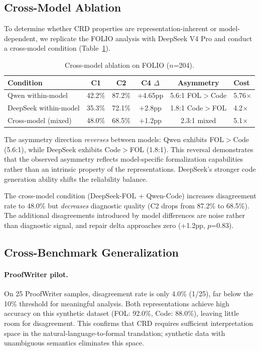 \documentclass[11pt]{article}
\begin{document}
\subsection{Cross-Model Ablation}
\label{sec:crossmodel}

To determine whether CRD properties are representation-inherent or model-dependent, we replicate the FOLIO analysis with DeepSeek V4 Pro and conduct a cross-model condition (Table~\ref{tab:crossmodel}).

\begin{table}[t]
\centering
\caption{Cross-model ablation on FOLIO ($n$=204).}
\label{tab:crossmodel}
\begin{tabular}{lccccl}
\toprule
Condition & C1 & C2 & C4 $\Delta$ & Asymmetry & Cost \\
\midrule
Qwen within-model      & 42.2\% & 87.2\% & $+$4.65pp & 5.6:1 FOL$>$Code  & 5.76$\times$ \\
DeepSeek within-model  & 35.3\% & 72.1\% & $+$2.8pp  & 1.8:1 Code$>$FOL  & 4.2$\times$ \\
Cross-model (mixed)    & 48.0\% & 68.5\% & $+$1.2pp  & 2.3:1 mixed       & 5.1$\times$ \\
\bottomrule
\end{tabular}
\end{table}

The asymmetry direction \emph{reverses} between models: Qwen exhibits FOL$>$Code (5.6:1), while DeepSeek exhibits Code$>$FOL (1.8:1). This reversal demonstrates that the observed asymmetry reflects model-specific formalization capabilities rather than an intrinsic property of the representations. DeepSeek's stronger code generation ability shifts the reliability balance.

The cross-model condition (DeepSeek-FOL + Qwen-Code) increases disagreement rate to 48.0\% but \emph{decreases} diagnostic quality (C2 drops from 87.2\% to 68.5\%). The additional disagreements introduced by model differences are noise rather than diagnostic signal, and repair delta approaches zero ($+$1.2pp, $p$=0.83).

\subsection{Cross-Benchmark Generalization}
\label{sec:crossbench}

\paragraph{ProofWriter pilot.} On 25 ProofWriter samples, disagreement rate is only 4.0\% (1/25), far below the 10\% threshold for meaningful analysis. Both representations achieve high accuracy on this synthetic dataset (FOL: 92.0\%, Code: 88.0\%), leaving little room for disagreement. This confirms that CRD requires sufficient interpretation space in the natural-language-to-formal translation; synthetic data with unambiguous semantics eliminates this space.
\end{document}
